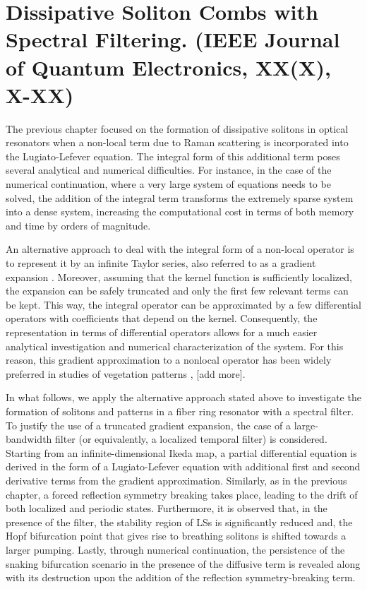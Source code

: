 \chapter{Dissipative Soliton Combs with Spectral Filtering. (IEEE Journal of Quantum Electronics, XX(X), X-XX)}

The previous chapter focused on the formation of dissipative solitons in optical
resonators when a non-local term due to Raman scattering is incorporated into the Lugiato-Lefever equation. The
integral form of this additional term poses several analytical and numerical difficulties.
For instance, in the case of the numerical continuation, where a very
large system of equations needs to be solved, the addition of the integral term transforms the extremely sparse
system into a dense system, increasing the computational cost in terms of both memory and time
by orders of magnitude.

An alternative approach to deal with the integral form of a non-local operator is to represent
it by an infinite Taylor series, also referred to as a gradient expansion \cite{murray2003mathematical}. Moreover, 
assuming that the kernel function is sufficiently localized, the expansion can be
safely truncated and only the first few relevant terms can be kept. This way, the integral operator can be
approximated by a few differential operators with coefficients that depend on
the kernel. Consequently, the representation in terms of differential operators
allows for a much easier analytical investigation and numerical characterization of the system.
For this reason, this gradient approximation to a nonlocal operator has been widely 
preferred in studies of vegetation patterns \cite{lefever1997origin}, [add more].

In what follows, we apply the alternative approach stated above to investigate
the formation of solitons and patterns in a fiber ring resonator with a spectral filter.
To justify the use of a truncated gradient expansion, the case of a large-bandwidth filter
(or equivalently, a localized temporal filter) is considered. Starting from an infinite-dimensional
Ikeda map, a partial differential equation is derived in the form of a Lugiato-Lefever equation with additional
first and second derivative terms from the gradient approximation. Similarly, as in the previous chapter,
a forced reflection symmetry breaking takes place, leading to the drift of both localized and periodic states.
Furthermore, it is observed that, in the presence of the filter, the stability region of LSs is significantly reduced
and, the Hopf bifurcation point that gives rise to breathing solitons is shifted towards a larger pumping.
Lastly, through numerical continuation, the persistence of the snaking bifurcation scenario in
the presence of the diffusive term is revealed along with its destruction upon the addition of the reflection symmetry-breaking term.

